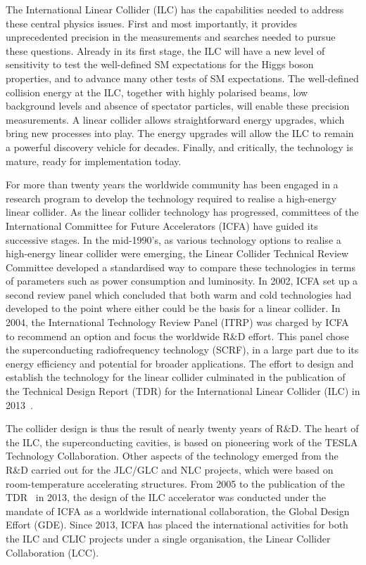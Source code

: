\documentclass[%
 reprint,
 amsmath,amssymb,
 aps,
]{revtex4-1}
\begin{document}
The International Linear Collider (ILC) has the capabilities needed
to address these central physics issues.  First and most importantly, it provides
unprecedented precision in the measurements and searches needed to
pursue these questions.  Already in its first stage, the 
ILC will have a new level of sensitivity to test the well-defined SM
expectations for the Higgs boson properties, and to advance many other 
tests of SM expectations.  
The well-defined collision energy at the ILC, together with highly polarised beams, low background levels and absence of spectator particles, will enable these precision measurements.
    A linear collider allows straightforward energy
upgrades, which bring new processes into play. 
The energy upgrades will allow the ILC to remain a powerful 
discovery vehicle for decades. 
Finally, and critically, the technology is mature, 
ready for implementation today.

For more than twenty years the worldwide community has been engaged in
a research program to develop the technology required to realise a
high-energy linear collider.  As the linear collider technology has
progressed,
committees of   the International Committee for Future Accelerators
(ICFA) have  guided its successive stages.
In the mid-1990's, as various technology options to
realise a high-energy linear collider were emerging, the 
Linear Collider Technical Review Committee developed a standardised
way to  compare  these  technologies in terms of parameters such as
power consumption and luminosity. In 2002, ICFA set up a second
review panel which concluded that both warm and cold technologies had
developed to the point where either could be the basis for a linear
collider. In 2004, the  International Technology Review Panel
(ITRP) was charged by ICFA to recommend an option and focus the
worldwide R\&D effort.  This panel chose the  superconducting
radiofrequency technology (SCRF), in a large part due to its
energy efficiency and potential for broader applications. 
The effort to design and
establish the technology for the linear collider culminated in the
publication of the Technical Design Report (TDR) for the International
Linear Collider (ILC) in 2013~\cite{Behnke:2013xla}. 


The collider design is thus the result of nearly twenty years of
R\&D. The heart of the ILC, the superconducting cavities, is based on
pioneering work of the TESLA Technology Collaboration. Other aspects of the 
technology
emerged from the R\&D carried out for the JLC/GLC and NLC projects,
which were based on room-temperature accelerating structures. From
2005 to the publication of the TDR~\cite{Behnke:2013xla} in 2013, the
design of the ILC accelerator was conducted under the mandate of ICFA
as a worldwide
international collaboration, the Global Design Effort (GDE). 
Since 2013, ICFA has placed the  international activities for both the ILC and CLIC
projects under a single organisation, 
the Linear Collider Collaboration (LCC).
\end{document}
